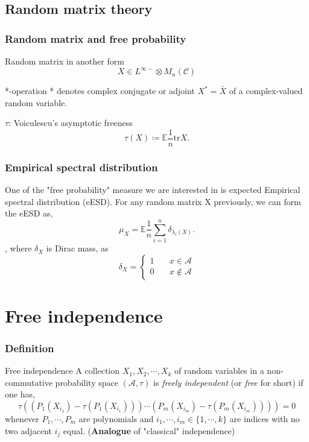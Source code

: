 \documentclass{beamer}
\begin{document}
\subsection{Random matrix theory}
\begin{frame}
\frametitle{Random matrix and free probability}
\begin{block}{Random matrix in another form}
\[
X \in L^{\infty-} \otimes M_n(\mathcal{C})
\]
\end{block}
\begin{block}{*-operation}
* denotes  complex conjugate or adjoint $X^* = \bar{X}$ of a complex-valued random variable. 
\end{block}
\begin{block}{$\tau$: Voiculescu's asymptotic freeness}
\[
\tau(X) \coloneqq \mathbb{E}\frac{1}{n}\text{tr}X.
\]
\end{block}
\end{frame}

\begin{frame}
\frametitle{Empirical spectral distribution}
One of the "free probability" measure we are interested in is expected Empirical spectral distribution (eESD). For any random matrix X previously, we can form the eESD as,
\[
\mu_X = \mathbb{E}\frac{1}{n} \sum_{i=1}^n \delta_{\lambda_i(X)}.
\],
where $\delta_{X}$ is Dirac mass, as 
\[ \delta_{X} =
  \begin{cases}
    1  & \quad x\in \mathcal{A}\\
    0  & \quad x\not\in \mathcal{A}
  \end{cases}
\]
\end{frame}

\section{Free independence}
\begin{frame}
\frametitle{Definition}
\begin{block}{Free independence}
A collection $X_1, X_2, \cdots, X_k$ of random variables in a non-commutative probability space $(\mathcal{A}, \tau)$ is \textit{freely independent} (or \textit{free} for short) if one has,
\[
\tau((P_1(X_{i_1})-\tau(P_1(X_{i_1})))\cdots(P_m(X_{i_m})-\tau(P_m(X_{i_m}))))=0
\]
whenever $P_1,\cdots, P_m$ are polynomials and $i_1, \cdots, i_m\in \{1,\cdots, k\}$ are indices with no two adjacent $i_j$ equal. (\textbf{Analogue} of "classical" independence)\\
\end{block}

\end{frame}
\end{document}
